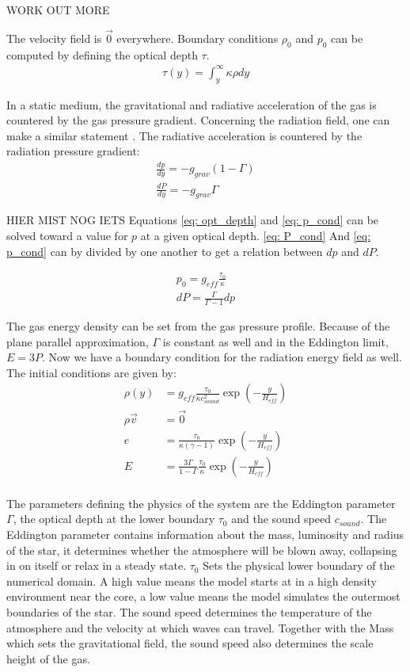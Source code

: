 WORK OUT MORE

The velocity field is $\vec{0}$ everywhere. Boundary conditions $\rho_0$ and $p_0$ can be computed by defining the optical depth $\tau$. 
\begin{align}
\tau(y) = \int^\infty_{y} \kappa \rho dy  \label{eq: opt_depth}
\end{align}

In a static medium, the gravitational and radiative acceleration of the gas is countered by the gas pressure gradient. Concerning the radiation field, one can make a similar statement . The radiative acceleration is countered by the radiation pressure gradient:
\begin{align}
\frac{dp}{dy} = -g_{grav}(1 - \Gamma) \label{eq: p_cond} \\
\frac{dP}{dy} = -g_{grav} \Gamma \label{eq: P_cond}
\end{align}

HIER MIST NOG IETS
Equations \eqref{eq: opt_depth} and \eqref{eq: p_cond} can be solved toward a value for $p$ at a given optical depth. \eqref{eq: P_cond} And \eqref{eq: p_cond} can by divided by one another to get a relation between $dp$ and $dP$.

\begin{align}
p_0 = g_{eff} \frac{\tau_0}{\kappa} \\
dP = \frac{\Gamma}{\Gamma-1} dp
\end{align}

The gas energy density can be set from the gas pressure profile. Because of the plane parallel approximation, $\Gamma$ is constant as well and in the Eddington limit, $E=3P$. Now we have a boundary condition for the radiation energy field as well. The initial conditions are given by:
\begin{align}
\rho(y) &= g_{eff} \frac{\tau_0}{\kappa c_{sound}^2} \exp \left( -\frac{y}{H_{eff}} \right) \\
\rho \vec{v} &= \vec{0} \\
e &= \frac{\tau_0}{\kappa (\gamma - 1)} \exp \left( -\frac{y}{H_{eff}} \right) \\
E &= \frac{3 \Gamma}{1-\Gamma} \frac{\tau_0}{\kappa} \exp \left( -\frac{y}{H_{eff}} \right) \\
\end{align}

The parameters defining the physics of the system are the Eddington parameter $\Gamma$, the optical depth at the lower boundary $\tau_0$ and the sound speed $c_{sound}$. The Eddington parameter contains information about the mass, luminosity and radius of the star, it determines whether the atmosphere will be blown away, collapsing in on itself or relax in a steady state. $\tau_0$ Sets the physical lower boundary of the numerical domain. A high value means the model starts at in a high density environment near the core, a low value means the model simulates the outermost boundaries of the star. The sound speed determines the temperature of the atmosphere and the velocity at which waves can travel. Together with the Mass which sets the gravitational field, the sound speed also determines the scale height of the gas. \\

